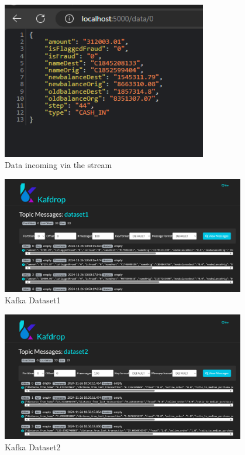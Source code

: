\documentclass[12pt,a4paper, hidelinks]{article}
\begin{document}
\begin{figure}[htbp]
  \centering
  \includegraphics[width=0.8\textwidth]{images/test-stream-M2.png}
  \caption{Data incoming via the stream}
  \label{fig:streaming-api}
\end{figure}


\begin{figure}[htbp]
  \centering
  \includegraphics[width=0.95\textwidth]{images/m2-kafka-1.png}
  \caption{Kafka Dataset1}
  \label{fig:kafka1}
\end{figure}

\begin{figure}[htbp]
  \centering
  \includegraphics[width=0.95\textwidth]{images/m2-kafka-2.png}
  \caption{Kafka Dataset2}
  \label{fig:kafka2}
\end{figure}
\end{document}

